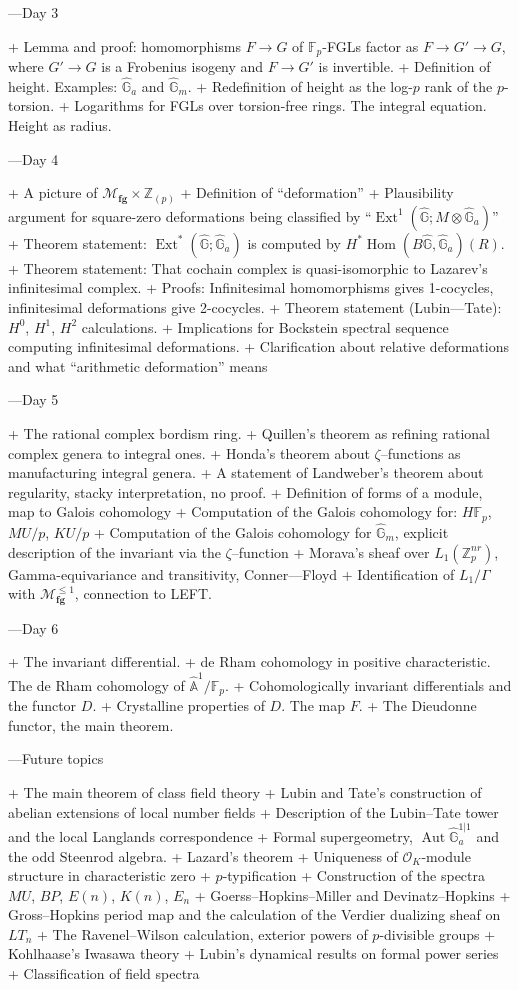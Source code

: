 \documentclass[12pt]{book}
\newcommand{\Z}{\mathbb Z}
\newcommand{\F}{\mathbb F}
\newcommand{\G}{\widehat{\mathbb G}}
\newcommand{\A}{\widehat{\mathbb{A}}}
\renewcommand{\O}{\mathcal O}
\newcommand{\<}{\langle}
\renewcommand{\>}{\rangle}
\newcommand{\moduli}[1]{\mathcal{M}_{\mathbf{#1}}}
\DeclareMathOperator{\Aut}{Aut}
\DeclareMathOperator{\Ext}{Ext}
\numberwithin{equation}{section}
\theoremstyle{plain}
\theoremstyle{definition}
\theoremstyle{remark}
\begin{document}
---Day 3

+ Lemma and proof: homomorphisms $F \to G$ of $\F_p$-FGLs factor as $F \to G' \to G$, where $G' \to G$ is a Frobenius isogeny and $F \to G'$ is invertible.
+ Definition of height.  Examples: $\G_a$ and $\G_m$.
+ Redefinition of height as the log-$p$ rank of the $p$-torsion.
+ Logarithms for FGLs over torsion-free rings.  The integral equation.  Height as radius.

---Day 4

+ A picture of $\moduli{fg} \times \Z_{(p)}$
+ Definition of ``deformation''
+ Plausibility argument for square-zero deformations being classified by ``$\Ext^1(\G; M \otimes \G_a)$''
+ Theorem statement: $\Ext^*(\G; \G_a)$ is computed by $H^* \operatorname{Hom}(B\G, \G_a)(R)$.
+ Theorem statement: That cochain complex is quasi-isomorphic to Lazarev's infinitesimal complex.
+ Proofs: Infinitesimal homomorphisms gives 1-cocycles, infinitesimal deformations give 2-cocycles.
+ Theorem statement (Lubin—Tate): $H^0$, $H^1$, $H^2$ calculations.
+ Implications for Bockstein spectral sequence computing infinitesimal deformations.
+ Clarification about relative deformations and what ``arithmetic deformation'' means

---Day 5

+ The rational complex bordism ring.
+ Quillen’s theorem as refining rational complex genera to integral ones.
+ Honda’s theorem about $\zeta$--functions as manufacturing integral genera.
+ A statement of Landweber's theorem about regularity, stacky interpretation, no proof.
+ Definition of forms of a module, map to Galois cohomology
+ Computation of the Galois cohomology for: $H\F_p$, $MU/p$, $KU/p$
+ Computation of the Galois cohomology for $\G_m$, explicit description of the invariant via the $\zeta$--function
+ Morava’s sheaf over $L_1(\Z_p^{nr})$, Gamma-equivariance and transitivity, Conner—Floyd
+ Identification of $L_1 / \Gamma$ with $\moduli{fg}^{\le 1}$, connection to LEFT.

---Day 6

+ The invariant differential.
+ de Rham cohomology in positive characteristic.  The de Rham cohomology of $\A^1 / \F_p$.
+ Cohomologically invariant differentials and the functor $D$.
+ Crystalline properties of $D$.  The map $F$.
+ The Dieudonne functor, the main theorem.

---Future topics

+ The main theorem of class field theory
+ Lubin and Tate's construction of abelian extensions of local number fields
+ Description of the Lubin--Tate tower and the local Langlands correspondence
+ Formal supergeometry, $\Aut \G_a^{1 | 1}$ and the odd Steenrod algebra.
+ Lazard's theorem
+ Uniqueness of $\O_K$-module structure in characteristic zero
+ $p$-typification
+ Construction of the spectra $MU$, $BP$, $E(n)$, $K(n)$, $E_n$
+ Goerss--Hopkins--Miller and Devinatz--Hopkins
+ Gross--Hopkins period map and the calculation of the Verdier dualizing sheaf on $LT_n$
+ The Ravenel--Wilson calculation, exterior powers of $p$-divisible groups
+ Kohlhaase's Iwasawa theory
+ Lubin's dynamical results on formal power series
+ Classification of field spectra
\end{document}
